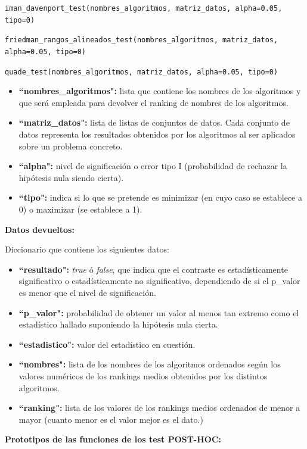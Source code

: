 \texttt{iman\_davenport\_test(nombres\_algoritmos, matriz\_datos, alpha=0.05, tipo=0)}

\texttt{friedman\_rangos\_alineados\_test(nombres\_algoritmos, matriz\_datos, alpha=0.05, tipo=0)}

\texttt{quade\_test(nombres\_algoritmos, matriz\_datos, alpha=0.05, tipo=0)}

\begin{itemize}
\item \textbf{``nombres\_algoritmos":} lista que contiene los nombres de los algoritmos y que será empleada para devolver el ranking de nombres de los algoritmos.
\item \textbf{``matriz\_datos":} lista de listas de conjuntos de datos. Cada conjunto de datos representa los resultados obtenidos por los algoritmos al ser aplicados sobre un problema concreto.
\item \textbf{``alpha":} nivel de significación o error tipo I (probabilidad de rechazar la hipótesis nula siendo cierta).
\item \textbf{``tipo":} indica si lo que se pretende es minimizar (en cuyo caso se establece a 0) o maximizar (se establece a 1).
\end{itemize}

\noindent
\textbf{Datos devueltos:}

Diccionario que contiene los siguientes datos:

\begin{itemize}
\item \textbf{``resultado":} \textit{true} ó \textit{false}, que indica que el contraste es estadísticamente significativo o estadísticamente no significativo, dependiendo de si el p\_valor es menor que el nivel de significación.
\item \textbf{``p\_valor":} probabilidad de obtener un valor al menos tan extremo como el estadístico hallado suponiendo la hipótesis nula cierta.
\item \textbf{``estadistico":} valor del estadístico en cuestión.
\item \textbf{``nombres":} lista de los nombres de los algoritmos ordenados según los valores numéricos de los rankings medios obtenidos por los distintos algoritmos.
\item \textbf{``ranking":} lista de los valores de los rankings medios ordenados de menor a mayor (cuanto menor es el valor mejor es el dato.)
\end{itemize}

\noindent
\textbf{Prototipos de las funciones de los test POST-HOC:}

